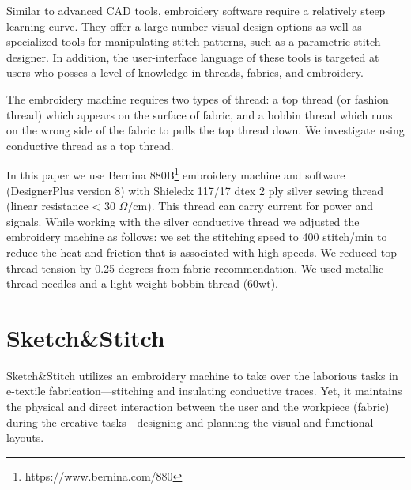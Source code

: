 \documentclass[header.tex]{subfiles}
\begin{document}
Similar to advanced CAD tools, embroidery software require a relatively steep learning curve. They offer a large number visual design options as well as specialized tools for manipulating stitch patterns, such as a parametric stitch designer. %
In addition, the user-interface language of these tools is targeted at users who posses a level of knowledge in threads, fabrics, and embroidery.



The embroidery machine requires two types of thread: a top thread (or fashion thread) which appears on the surface of fabric, and a bobbin thread which runs on the wrong side of the fabric to pulls the top thread down. We investigate using conductive thread as a top thread.

In this paper we use Bernina 880B\footnote{https://www.bernina.com/880} embroidery machine and software (DesignerPlus version 8) with Shieledx 117/17 dtex 2 ply silver sewing thread (linear resistance < 30 $\Omega$/cm). 
This thread can carry current for power and signals. While working with the silver conductive thread we adjusted the embroidery machine as follows: we set the stitching speed to 400 stitch/min to reduce the heat and friction that is associated with high speeds. We reduced top thread tension by 0.25 degrees from fabric recommendation. We used metallic thread needles and a light weight bobbin thread (60wt).











\section{Sketch\&Stitch}
Sketch\&Stitch utilizes an embroidery machine to take over the laborious tasks in e-textile fabrication---stitching and insulating conductive traces. Yet, it maintains the physical and direct interaction between the user and the workpiece (fabric) during the creative tasks---designing and planning the visual and functional layouts. 
\end{document}
